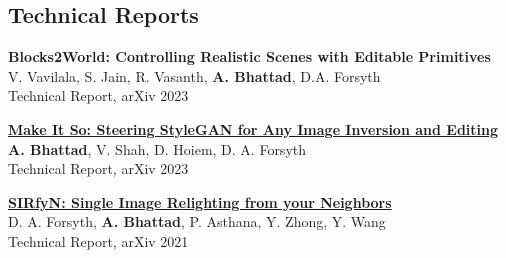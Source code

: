 \documentclass[margin,line]{res}
\begin{document}
\begin{resume}
\section{\sc \large Technical Reports}
\renewcommand*{\labelenumi}{\theenumi.}
\begin{etaremune}[start=3, leftmargin=15pt]

\item {\bf {Blocks2World: Controlling Realistic Scenes with Editable Primitives}}\\
{V. Vavilala, S. Jain, R. Vasanth, {\bf A. Bhattad}, D.A. Forsyth}\\
Technical Report, arXiv 2023

\item {\bf \href{}{Make It So: Steering StyleGAN for Any Image Inversion and Editing}} \\{{\bf A. Bhattad}, V. Shah, D. Hoiem, D. A. Forsyth}\\
Technical Report, arXiv 2023
\item {\bf \href{https://arxiv.org/abs/2112.04497}{SIRfyN: Single Image Relighting from your Neighbors }} \\{D. A. Forsyth, {\bf A. Bhattad}, P. Asthana, Y. Zhong, Y. Wang}\\
Technical Report, arXiv 2021
\end{etaremune}


\end{resume}
\end{document}
